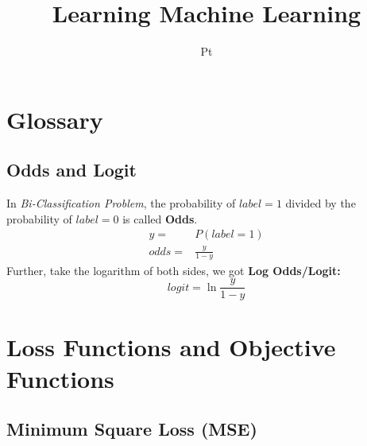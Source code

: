 \documentclass{article}
\title{Learning Machine Learning}
\author{Pt}
\begin{document}
    \maketitle
    \tableofcontents
    \clearpage

    \section{Glossary}
    \subsection{Odds and Logit}
    In \emph{Bi-Classification Problem}, the probability of $label=1$ divided by the probability of $label=0$ is called \textbf{Odds}.
    \begin{align*}
        y =& P(label=1)\\
        odds =& \frac{y}{1-y}
    \end{align*}
    Further, take the logarithm of both sides, we got \textbf{Log Odds/Logit:}
    \begin{equation*}
        logit = \ln\frac{y}{1-y}
    \end{equation*}
    \section{Loss Functions and Objective Functions}
    \subsection{Minimum Square Loss (MSE)}
\end{document}

